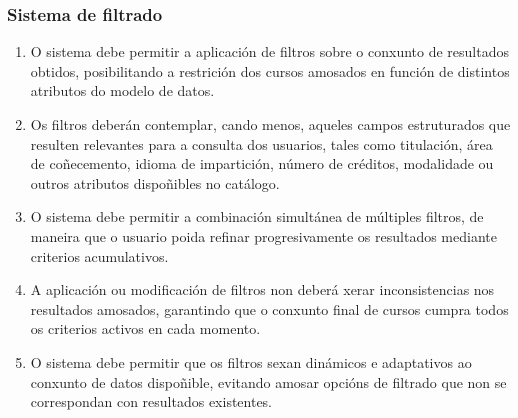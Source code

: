 \documentclass[%
    a4paper,               %
    twoside,                %
    parskip=full,           %
    10pt,                   %
    titlepage=on,           %
    captions=tableabove,    %
]{article}                  %
\begin{document}
\subsubsection{Sistema de filtrado}
\begin{enumerate}
    \item O sistema debe permitir a aplicación de filtros sobre o conxunto de resultados obtidos, posibilitando a restrición dos cursos amosados en función de distintos atributos do modelo de datos.

    \item Os filtros deberán contemplar, cando menos, aqueles campos estruturados que resulten relevantes para a consulta dos usuarios, tales como titulación, área de coñecemento, idioma de impartición, número de créditos, modalidade ou outros atributos dispoñibles no catálogo.

    \item O sistema debe permitir a combinación simultánea de múltiples filtros, de maneira que o usuario poida refinar progresivamente os resultados mediante criterios acumulativos.

    \item A aplicación ou modificación de filtros non deberá xerar inconsistencias nos resultados amosados, garantindo que o conxunto final de cursos cumpra todos os criterios activos en cada momento.


    \item O sistema debe permitir que os filtros sexan dinámicos e adaptativos ao conxunto de datos dispoñible, evitando amosar opcións de filtrado que non se correspondan con resultados existentes.


\end{enumerate}
\end{document}
